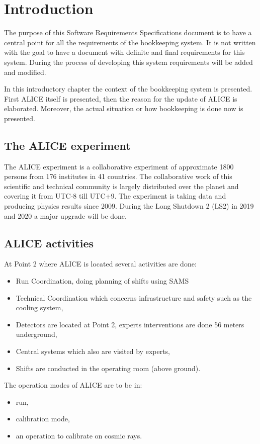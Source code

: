 \chapter{Introduction}
The purpose of this Software Requirements Specifications document is to have a central point for all the requirements of the bookkeeping system. It is not written with the goal to have a document with definite and final requirements for this system. During the process of developing this system requirements will be added and modified.

In this introductory chapter the context of the bookkeeping system is presented. First ALICE itself is presented, then the reason for the update of ALICE is elaborated. Moreover, the actual situation or how bookkeeping is done now is presented.


\section{The ALICE experiment}
The ALICE experiment is a collaborative experiment of approximate 1800 persons from 176 institutes in 41 countries. The collaborative work of this scientific and technical community is largely distributed over the planet and covering it from UTC-8 till UTC+9. The experiment is taking data and producing physics results since 2009. During the Long Shutdown 2 (LS2) in 2019 and 2020 a major upgrade will be done. 

\section{ALICE activities}


At Point 2 where ALICE is located several activities are done:
\begin{itemize}
  \item Run Coordination, doing planning of shifts using SAMS
  \item Technical Coordination which concerns infrastructure and safety such as the cooling system,
  \item Detectors are located at Point 2, experts interventions are done 56 meters underground,
  \item Central systems which also are visited by experts,
  \item Shifts are conducted in the operating room (above ground).
\end{itemize}

The operation modes of ALICE are to be in:
\begin{itemize}
  \item run, 
  \item calibration mode,
  \item an operation to calibrate on cosmic rays.
\end{itemize} 


